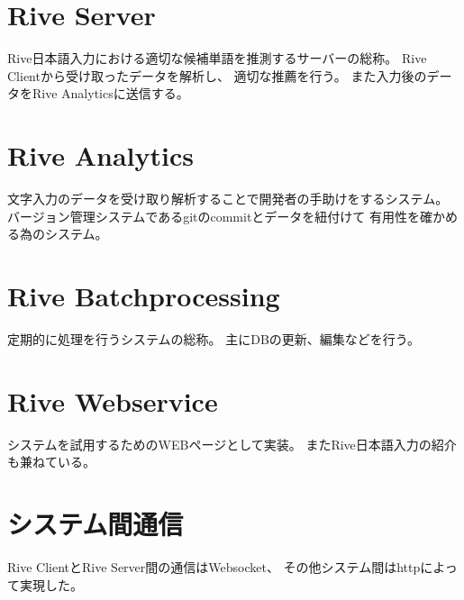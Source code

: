 \section{Rive Server}
Rive日本語入力における適切な候補単語を推測するサーバーの総称。
Rive Clientから受け取ったデータを解析し、
適切な推薦を行う。
また入力後のデータをRive Analyticsに送信する。

\section{Rive Analytics}
文字入力のデータを受け取り解析することで開発者の手助けをするシステム。
バージョン管理システムであるgitのcommitとデータを紐付けて
有用性を確かめる為のシステム。

\section{Rive Batchprocessing}
定期的に処理を行うシステムの総称。
主にDBの更新、編集などを行う。

\section{Rive Webservice}
システムを試用するためのWEBページとして実装。
またRive日本語入力の紹介も兼ねている。

\section{システム間通信}
Rive ClientとRive Server間の通信はWebsocket、
その他システム間はhttpによって実現した。
